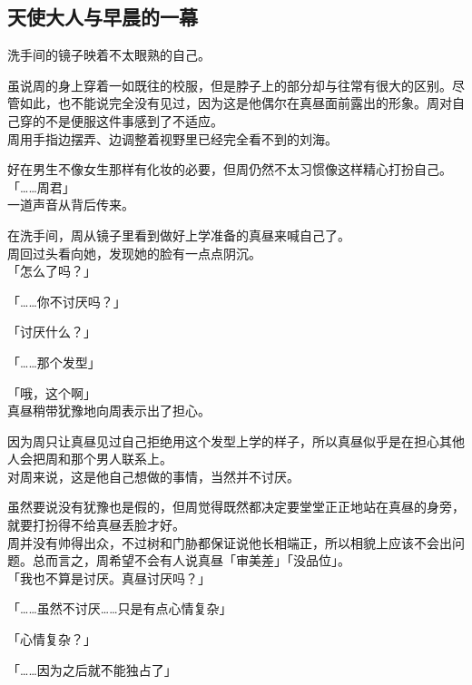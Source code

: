 \subsection{天使大人与早晨的一幕}

洗手间的镜子映着不太眼熟的自己。

虽说周的身上穿着一如既往的校服，但是脖子上的部分却与往常有很大的区别。尽管如此，也不能说完全没有见过，因为这是他偶尔在真昼面前露出的形象。周对自己穿的不是便服这件事感到了不适应。\\

周用手指边摆弄、边调整着视野里已经完全看不到的刘海。

好在男生不像女生那样有化妆的必要，但周仍然不太习惯像这样精心打扮自己。\\

「……周君」\\

一道声音从背后传来。

在洗手间，周从镜子里看到做好上学准备的真昼来喊自己了。\\

周回过头看向她，发现她的脸有一点点阴沉。\\

「怎么了吗？」

「……你不讨厌吗？」

「讨厌什么？」

「……那个发型」

「哦，这个啊」\\

真昼稍带犹豫地向周表示出了担心。

因为周只让真昼见过自己拒绝用这个发型上学的样子，所以真昼似乎是在担心其他人会把周和那个男人联系上。\\

对周来说，这是他自己想做的事情，当然并不讨厌。

虽然要说没有犹豫也是假的，但周觉得既然都决定要堂堂正正地站在真昼的身旁，就要打扮得不给真昼丢脸才好。\\

周并没有帅得出众，不过树和门胁都保证说他长相端正，所以相貌上应该不会出问题。总而言之，周希望不会有人说真昼「审美差」「没品位」。\\

「我也不算是讨厌。真昼讨厌吗？」

「……虽然不讨厌……只是有点心情复杂」

「心情复杂？」

「……因为之后就不能独占了」\\

